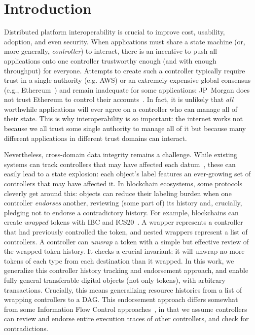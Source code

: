 \documentclass[a4paper,USenglish,cleveref, autoref, thm-restate, anonymous]{lipics-v2021}
\begin{document}
\section{Introduction}
Distributed platform interoperability is crucial to improve cost, usability, adoption, and even security. 
When applications must share a state machine (or, more generally, \emph{controller}) to interact, there is an incentive to push all applications onto one controller trustworthy enough (and with enough throughput) for everyone. 
Attempts to create such a controller typically require trust in a single authority (e.g. AWS\cite{appsync}) or an extremely expensive global consensus (e.g., Ethereum~\cite{ethereum}) and remain inadequate for some applications:
 JP~Morgan does not trust Ethereum to control their accounts~\cite{onyx}.
In fact, it is unlikely that \emph{all} worthwhile applications will ever agree on a controller who can manage all of their state.
This is why interoperability is so important: the internet works not because we all trust some single authority to manage all of it but because many different applications in different trust domains can interact. 

Nevertheless, cross-domain data integrity remains a challenge.
While  existing systems can track controllers that may have affected each datum~\cite{dista,fabric}, these can easily lead to a state explosion: each object's label features an ever-growing set of controllers that may have affected it. 
In blockchain ecosystems, some protocols cleverly get around this: objects can reduce their labeling burden when one controller \emph{endorses} another, reviewing (some part of) its history and, crucially, pledging not to endorse a contradictory history.
For example, blockchains can create \emph{wrapped} tokens with IBC and ICS20~\cite{wrapped,ibc, ics20}. 
A wrapper represents a controller that had previously controlled the token, and nested wrappers represent a list of controllers. 
A controller can \emph{unwrap} a token with a simple but effective review of the wrapped token history. 
It checks a crucial invariant: it will unwrap no more tokens of each type from each destination than it wrapped. 
In this work, we generalize this controller history tracking and endorsement approach, and enable fully general transferable digital objects (not only tokens), with arbitrary transactions. 
Crucially, this means generalizing resource histories from a list of wrapping controllers to a DAG.
This endorsement approach differs somewhat from some Information Flow Control approaches~\cite{fabric, Cecchetti2017}, in that we assume controllers can review and endorse entire execution traces of other controllers, and check for contradictions.
\end{document}
